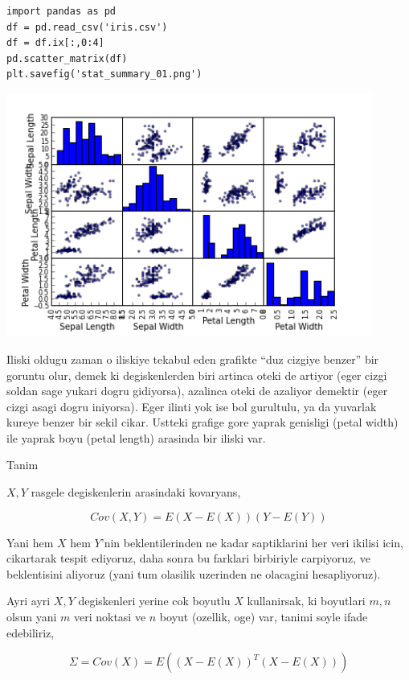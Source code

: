 \documentclass[12pt,fleqn]{article}\usepackage{../common}
\begin{document}
\begin{verbatim}
import pandas as pd
df = pd.read_csv('iris.csv')
df = df.ix[:,0:4]
pd.scatter_matrix(df)
plt.savefig('stat_summary_01.png')
\end{verbatim}

\includegraphics[height=8cm]{stat_cov_corr_01.png}

Iliski oldugu zaman o iliskiye tekabul eden grafikte ``duz cizgiye benzer''
bir goruntu olur, demek ki degiskenlerden biri artinca oteki de artiyor
(eger cizgi soldan sage yukari dogru gidiyorsa), azalinca oteki de azaliyor
demektir (eger cizgi asagi dogru iniyorsa). Eger ilinti yok ise bol
gurultulu, ya da yuvarlak kureye benzer bir sekil cikar. Ustteki grafige
gore yaprak genisligi (petal width) ile yaprak boyu (petal length) arasinda
bir iliski var.

Tanim

$X,Y$ rasgele degiskenlerin arasindaki kovaryans,

$$ Cov(X,Y) = E(X-E(X))(Y-E(Y)) $$

Yani hem $X$ hem $Y$'nin beklentilerinden ne kadar saptiklarini her veri
ikilisi icin, cikartarak tespit ediyoruz, daha sonra bu farklari birbiriyle
carpiyoruz, ve beklentisini aliyoruz (yani tum olasilik uzerinden ne
olacagini hesapliyoruz). 

Ayri ayri $X,Y$ degiskenleri yerine cok boyutlu $X$ kullanirsak, ki
boyutlari $m,n$ olsun yani $m$ veri noktasi ve $n$ boyut (ozellik, oge)
var, tanimi soyle ifade edebiliriz,

$$ \Sigma = Cov(X) = E((X-E(X))^T(X-E(X))) $$
\end{document}

